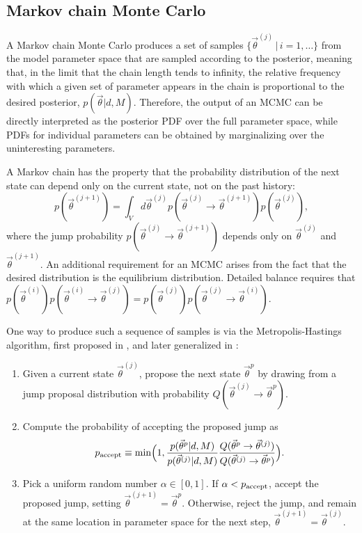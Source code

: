 \documentclass{rsos}
\newcommand{\vtheta}{\vec{\theta}}
\newcommand{\be}{\begin{equation}}
\newcommand{\ee}{\end{equation}}
\newcommand{\bel}[1]{\begin{equation}\label{#1}}
\begin{document}
\subsection{Markov chain Monte Carlo} \label{sec:mcmc}

A Markov chain Monte Carlo \cite{Gilks:1996} produces a set of samples
$\{ \vtheta^{(j)} \, | \, i = 1, \ldots \}$ from the model parameter
space that are sampled according to the posterior, meaning that, in
the limit that the chain length tends to infinity, the relative
frequency with which a given set of parameter appears in the chain is
proportional to the desired posterior, $p(\vtheta|d,M)$.  Therefore,
the output of an MCMC can be directly interpreted as the posterior PDF
over the full parameter space, while PDFs for individual parameters
can be obtained by marginalizing over the uninteresting parameters.

A Markov chain has the property that the probability distribution of
the next state can depend only on the current state, not on the past
history: 
%
\be 
p(\vtheta^{(j+1)})=\int_{V} d\vtheta^{(j)} p(\vtheta^{(j)} \to
\vtheta^{(j+1)}) p(\vtheta^{(j)}), \ee
%
where the jump probability $p(\vtheta^{(j)} \to \vtheta^{(j+1)})$
depends only on $\vtheta^{(j)}$ and $\vtheta^{(j+1)}$.  An additional
requirement for an MCMC arises from the fact that the desired
distribution is the equilibrium distribution.  Detailed balance requires that
$p(\vtheta^{(i)}) p(\vtheta^{(i)} \to \vtheta^{(j)}) = p(\vtheta^{(j)}) p(\vtheta^{(j)} \to \vtheta^{(i)})$.


One way to produce such a sequence of samples is via the
Metropolis-Hastings algorithm, first proposed in
\cite{Metropolis:1953}, and later generalized in
\cite{Hastings:1970}:
\begin{enumerate}
\item Given a current state $\vtheta^{(j)}$, propose the next state
  $\vtheta^p$ by drawing from a jump proposal distribution with
  probability $Q(\vtheta^{(j)} \to \vtheta^p)$.
\item Compute the probability of accepting the proposed jump as
  \bel{eq:p-accept} 
p_{\textnormal{accept}} \equiv \min\Bigl(1,
\frac{p(\vtheta^p|d, M)}{p(\vtheta^{(j)}|d, M)} \frac{Q(\vtheta^p \to
  \vtheta^{(j)})}{Q(\vtheta^{(j)} \to \vtheta^p)} \Bigr).  
\ee
\item Pick a uniform random number $\alpha \in [0,1]$.  If $\alpha<
  p_{\textnormal{accept}}$, accept the proposed jump, setting
  $\vtheta^{(j+1)}=\vtheta^p$.  Otherwise, reject the jump, and remain
  at the same location in parameter space for the next step,
  $\vtheta^{(j+1)}=\vtheta^{(j)}$.
\end{enumerate}
 
\end{document}
